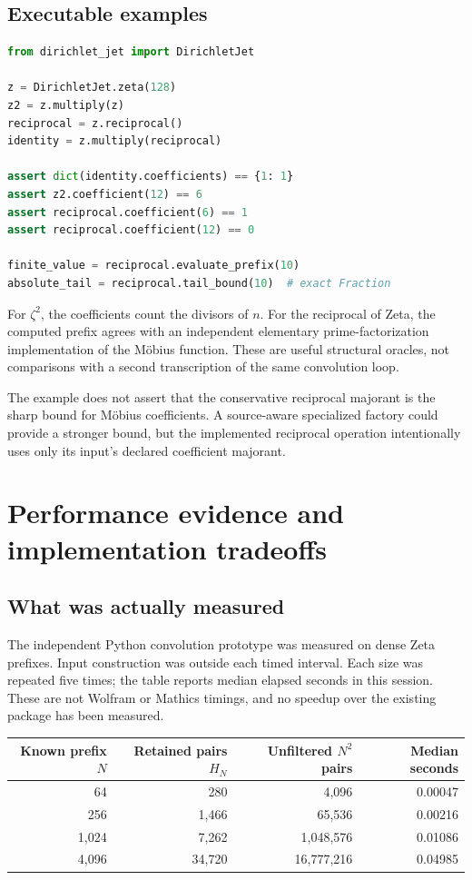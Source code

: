 \documentclass[11pt,letterpaper]{article}
\begin{document}
\subsection{Executable examples}
\begin{lstlisting}[language=Python]
from dirichlet_jet import DirichletJet

z = DirichletJet.zeta(128)
z2 = z.multiply(z)
reciprocal = z.reciprocal()
identity = z.multiply(reciprocal)

assert dict(identity.coefficients) == {1: 1}
assert z2.coefficient(12) == 6
assert reciprocal.coefficient(6) == 1
assert reciprocal.coefficient(12) == 0

finite_value = reciprocal.evaluate_prefix(10)
absolute_tail = reciprocal.tail_bound(10)  # exact Fraction
\end{lstlisting}
For $\zeta^2$, the coefficients count the divisors of $n$. For the reciprocal
of Zeta, the computed prefix agrees with an independent elementary
prime-factorization implementation of the M\"obius function. These are useful
structural oracles, not comparisons with a second transcription of the same
convolution loop.

The example does not assert that the conservative reciprocal majorant is the
sharp bound for M\"obius coefficients. A source-aware specialized factory could
provide a stronger bound, but the implemented reciprocal operation intentionally
uses only its input's declared coefficient majorant.

\section{Performance evidence and implementation tradeoffs}
\subsection{What was actually measured}
The independent Python convolution prototype was measured on dense Zeta
prefixes. Input construction was outside each timed interval. Each size was
repeated five times; the table reports median elapsed seconds in this session.
These are not Wolfram or Mathics timings, and no speedup over the existing
package has been measured.

\begin{center}
\begin{tabular}{rrrr}
\toprule
Known prefix $N$ & Retained pairs $H_N$ & Unfiltered $N^2$ pairs & Median seconds\\\midrule
64 & 280 & 4,096 & 0.00047\\
256 & 1,466 & 65,536 & 0.00216\\
1,024 & 7,262 & 1,048,576 & 0.01086\\
4,096 & 34,720 & 16,777,216 & 0.04985\\\bottomrule
\end{tabular}
\end{center}
\end{document}
